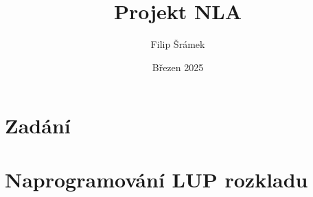 \documentclass[11pt,a4paper]{article}
\title{Projekt NLA}
\author{Filip Šrámek}
\date{Březen 2025}
\begin{document}
\maketitle

\section*{Zadání}
\section{Naprogramování LUP rozkladu}
\end{document}
